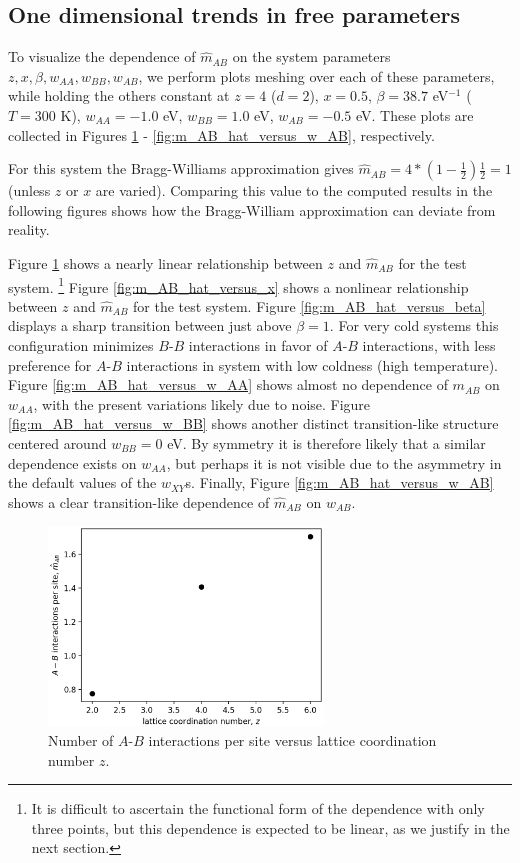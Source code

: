 \documentclass[10pt]{article}
\begin{document}
\subsection{One dimensional trends in free parameters}
To visualize the dependence of $\hat{m}_{AB}$ on the system parameters $z,x,\beta,w_{AA},w_{BB},w_{AB}$, we perform plots meshing over each of these parameters, while holding the others constant at $z=4$ ($d = 2$), $x = 0.5$, $\beta = 38.7$ eV$^{-1}$ ($T = 300$ K), $w_{AA} = -1.0$ eV, $w_{BB} = 1.0$ eV, $w_{AB} = -0.5$ eV.
These plots are collected in Figures \ref{fig:m_AB_hat_versus_z} - \ref{fig:m_AB_hat_versus_w_AB}, respectively.

For this system the Bragg-Williams approximation gives $\hat{m}_{AB} = 4*\left(1-\frac{1}{2}\right) \frac{1}{2} = 1$ (unless $z$ or $x$ are varied).
Comparing this value to the computed results in the following figures shows how the Bragg-William approximation can deviate from reality.

Figure \ref{fig:m_AB_hat_versus_z} shows a nearly linear relationship between $z$ and $\hat{m}_{AB}$ for the test system. \footnote{It is difficult to ascertain the functional form of the dependence with only three points, but this dependence is expected to be linear, as we justify in the next section.} 
Figure \ref{fig:m_AB_hat_versus_x} shows a nonlinear relationship between $z$ and $\hat{m}_{AB}$ for the test system.
Figure \ref{fig:m_AB_hat_versus_beta} displays a sharp transition between just above $\beta = 1$. For very cold systems this configuration minimizes $B$-$B$ interactions in favor of $A$-$B$ interactions, with less preference for $A$-$B$ interactions in system with low coldness (high temperature).
Figure \ref{fig:m_AB_hat_versus_w_AA} shows almost no dependence of $m_{AB}$ on $w_{AA}$, with the present variations likely due to noise.
Figure \ref{fig:m_AB_hat_versus_w_BB} shows another distinct transition-like structure centered around $w_{BB}=0$ eV.
By symmetry it is therefore likely that a similar dependence exists on $w_{AA}$, but perhaps it is not visible due to the asymmetry in the default values of the $w_{XY}$s.
Finally, Figure \ref{fig:m_AB_hat_versus_w_AB} shows a clear transition-like dependence of $\hat{m}_{AB}$ on $w_{AB}$.

\begin{figure}[h!]
\centering
\includegraphics[width=0.65\textwidth]{Figures/m_AB_hat_versus_z.png}
\caption{Number of $A$-$B$ interactions per site versus lattice coordination number $z$.}
\label{fig:m_AB_hat_versus_z}
\end{figure}
\end{document}
